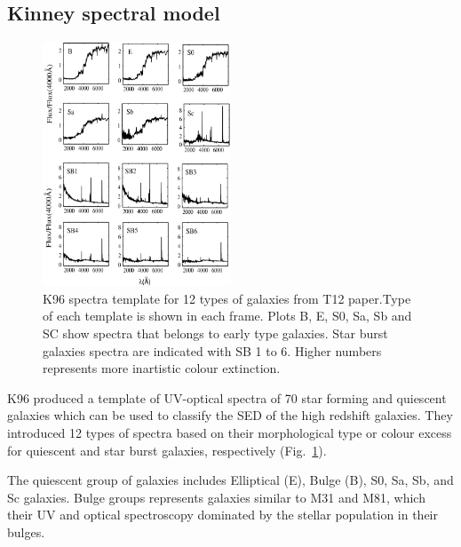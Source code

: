  \subsection{Kinney spectral model}
     \begin{figure}
        \centering
        \includegraphics[width=0.5\textwidth]{../images/k96.jpg}
        \caption{K96 spectra template for 12 types of galaxies from T12 paper.Type of each template is shown in each frame. Plots B, E, S0, Sa, Sb and SC show spectra that belongs to early type galaxies. Star burst galaxies spectra are indicated with SB 1 to 6. Higher numbers represents more inartistic colour extinction.}
        \label{fig: k96}
    \end{figure}
    K96 produced a template of UV-optical spectra of 70 star forming and quiescent galaxies which can be used to classify the SED of the high redshift galaxies. %
    They introduced 12 types of spectra based on their morphological type or colour excess for quiescent and star burst galaxies, respectively (Fig.~\ref{fig: k96}). %

    The quiescent group of galaxies includes Elliptical (E), Bulge (B), S0, Sa, Sb, and Sc galaxies.
    Bulge groups represents galaxies similar to M31 and M81, which their UV and optical spectroscopy dominated by the stellar population in their bulges.
    
